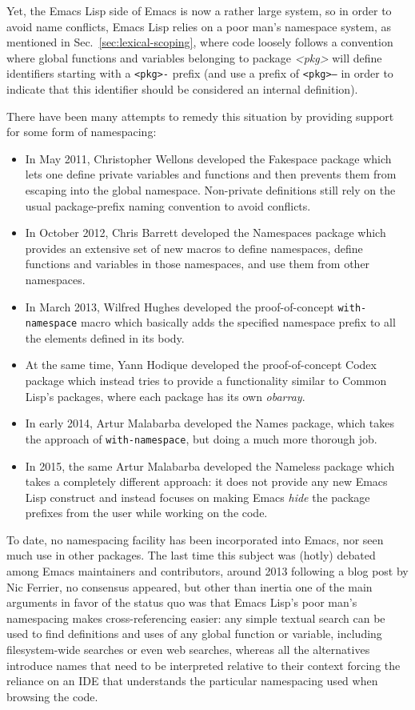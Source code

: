\documentclass[format=acmsmall, review]{acmart}
\newcommand \Elisp {Emacs Lisp}
\begin{document}
Yet, the \Elisp{} side of Emacs is now a rather large system, so in order to
avoid name conflicts, \Elisp{} relies on a poor man's namespace system, as
mentioned in Sec.~\ref{sec:lexical-scoping}, where code loosely follows
a convention where global functions and variables belonging to package
\textsl{<pkg>} will define identifiers starting with a \texttt{<pkg>-}
prefix (and use a prefix of \texttt{<pkg>--} in order to indicate that this
identifier should be considered an internal definition).

There have been many attempts to remedy this situation by providing support
for some form of namespacing:
\begin{itemize}
\item In May 2011, Christopher Wellons developed the Fakespace package which
  lets one define private variables and functions and then prevents them
  from escaping into the global namespace.  Non-private definitions still
  rely on the usual package-prefix naming convention to avoid conflicts.
\item In October 2012, Chris Barrett developed the Namespaces package which
  provides an extensive set of new macros to define namespaces, define
  functions and variables in those namespaces, and use them from
  other namespaces.
\item In March 2013, Wilfred Hughes developed the proof-of-concept
  \texttt{with-namespace} macro which basically adds the specified namespace
  prefix to all the elements defined in its body.
\item At the same time, Yann Hodique developed the proof-of-concept Codex
  package which instead tries to provide a functionality similar to
  Common Lisp's packages, where each package has its own \emph{obarray}.
\item In early 2014, Artur Malabarba developed the Names package, which
  takes the approach of \texttt{with-namespace}, but doing a much more
  thorough job.
\item In 2015, the same Artur Malabarba developed the Nameless package which
  takes a completely different approach: it does not provide any new
  \Elisp{} construct and instead focuses on making Emacs \emph{hide} the
  package prefixes from the user while working on the code.
\end{itemize}
To date, no namespacing facility has been incorporated into Emacs, nor seen
much use in other packages.  The last time this subject was (hotly) debated
among Emacs maintainers and contributors, around 2013 following a blog post
by Nic Ferrier, no consensus appeared, but other than inertia one of the
main arguments in favor of the status quo was that \Elisp's poor man's
namespacing makes cross-referencing easier: any simple textual search can be
used to find definitions and uses of any global function or variable,
including filesystem-wide searches or even web searches,
whereas all the alternatives introduce names that need to be interpreted
relative to their context forcing the reliance on an IDE that understands the
particular namespacing used when browsing the code.
\end{document}
